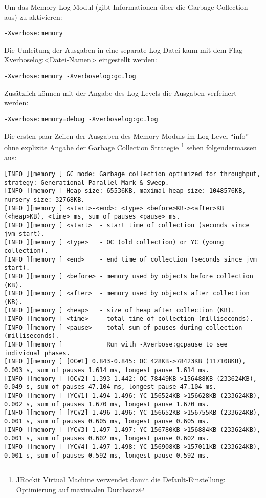 Um das Memory Log Modul (gibt Informationen über die Garbage Collection aus) zu aktivieren:
\begin{lstlisting}[caption=Garbage Collection Log (Info)]
-Xverbose:memory
\end{lstlisting}

Die Umleitung der Ausgaben in eine separate Log-Datei kann mit dem Flag -Xverboselog:<Datei-Namen> eingestellt werden:
\begin{lstlisting}[caption=Garbage Collection Log (Info) - Umleitung in gc.log]
-Xverbose:memory -Xverboselog:gc.log 
\end{lstlisting}


Zusätzlich können mit der Angabe des Log-Levels die Ausgaben verfeinert werden:
\begin{lstlisting}[caption=Garbage Collection Log (Debug) - Umleitung in gc.log]
-Xverbose:memory=debug -Xverboselog:gc.log 
\end{lstlisting}

\begin{landscape}
Die ersten paar Zeilen der Ausgaben des Memory Moduls im Log Level ``info'' ohne explizite Angabe der Garbage Collection Strategie \footnote{JRockit Virtual Machine verwendet damit die Default-Einstellung: Optimierung auf maximalen Durchsatz} sehen folgendermassen aus:
\begin{lstlisting}[caption=Garbage Collection Log (Debug) - Umleitung in gc.log]
[INFO ][memory ] GC mode: Garbage collection optimized for throughput, strategy: Generational Parallel Mark & Sweep.
[INFO ][memory ] Heap size: 65536KB, maximal heap size: 1048576KB, nursery size: 32768KB.
[INFO ][memory ] <start>-<end>: <type> <before>KB-><after>KB (<heap>KB), <time> ms, sum of pauses <pause> ms.
[INFO ][memory ] <start>  - start time of collection (seconds since jvm start).
[INFO ][memory ] <type>   - OC (old collection) or YC (young collection).
[INFO ][memory ] <end>    - end time of collection (seconds since jvm start).
[INFO ][memory ] <before> - memory used by objects before collection (KB).
[INFO ][memory ] <after>  - memory used by objects after collection (KB).
[INFO ][memory ] <heap>   - size of heap after collection (KB).
[INFO ][memory ] <time>   - total time of collection (milliseconds).
[INFO ][memory ] <pause>  - total sum of pauses during collection (milliseconds).
[INFO ][memory ]            Run with -Xverbose:gcpause to see individual phases.
[INFO ][memory ] [OC#1] 0.843-0.845: OC 428KB->78423KB (117108KB), 0.003 s, sum of pauses 1.614 ms, longest pause 1.614 ms.
[INFO ][memory ] [OC#2] 1.393-1.442: OC 78449KB->156488KB (233624KB), 0.049 s, sum of pauses 47.104 ms, longest pause 47.104 ms.
[INFO ][memory ] [YC#1] 1.494-1.496: YC 156524KB->156628KB (233624KB), 0.002 s, sum of pauses 1.670 ms, longest pause 1.670 ms.
[INFO ][memory ] [YC#2] 1.496-1.496: YC 156652KB->156755KB (233624KB), 0.001 s, sum of pauses 0.605 ms, longest pause 0.605 ms.
[INFO ][memory ] [YC#3] 1.497-1.497: YC 156780KB->156884KB (233624KB), 0.001 s, sum of pauses 0.602 ms, longest pause 0.602 ms.
[INFO ][memory ] [YC#4] 1.497-1.498: YC 156908KB->157011KB (233624KB), 0.001 s, sum of pauses 0.592 ms, longest pause 0.592 ms.
\end{lstlisting}
\end{landscape}

